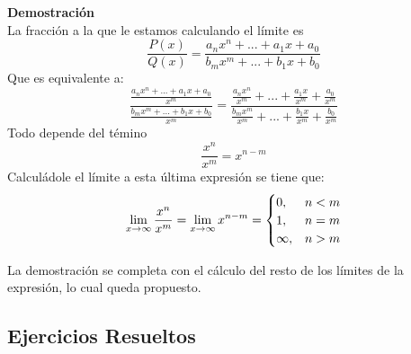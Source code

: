 \documentclass[10pt,twoside]{SelfArx} %
\begin{document}
\textbf{Demostración}\\
La fracción a la que le estamos calculando el límite es\\
\[ \frac{P(x)}{Q(x)}=\frac{a_{n} x^{n}+...+a_{1} x+a_{0}}{b_{m} x^{m}+...+b_{1} x+b_{0}} \]
Que es equivalente a:\\
\[ \frac{\frac{a_{n} x^{n}+...+a_{1} x+a_{0}}{x^{m}}}{\frac{b_{m} x^{m}+...+b_{1} x+b_{0}}{x^{m}}}= 
\frac{\frac{a_{n} x^{n}}{x^{m}}+...+\frac{a_{1} x}{x^{m}}+\frac{a_{0}}{x^{m}}}{\frac{b_{m} x^{m}}{x^{m}}+...+\frac{b_{1} x}{x^{m}}+\frac{b_{0}}{x^{m}}}
\]
Todo depende del témino\\
\[ \dfrac{x^{n}}{x^{m}}=x^{n-m} \]
Calculádole el límite a esta última expresión se tiene que:\\
\[ \lim\limits_{x\rightarrow\infty}\dfrac{x^{n}}{x^{m}}=\lim\limits_{x\rightarrow\infty}x^{n-m}=\begin{cases}
0, & \mbox{$ n < m $} \\
1, & \mbox{$  n=m $}\\
\infty, &  \mbox{$ n>m $}\\
\end{cases}
\]


La demostración se completa con el cálculo del resto de los límites de la expresión, lo cual queda propuesto.\\



\subsection{Ejercicios Resueltos}
\end{document}
